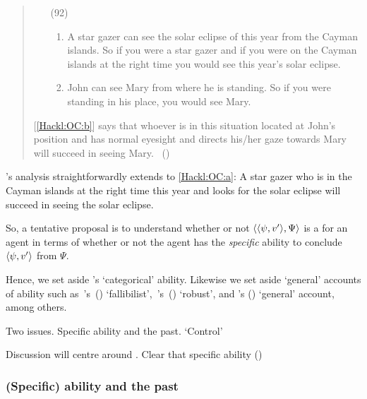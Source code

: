 \begin{note}
  \begin{quote}
    \begin{enumerate}
    \item[(92)]
      \begin{enumerate}[label=\alph*., ref=(\alph*)]
      \item
        \label{Hackl:OC:a}
        A star gazer can see the solar eclipse of this year from the Cayman islands.\newline
        So if you were a star gazer and if you were on the Cayman islands at the right time you would see this year's solar eclipse.
      \item
        \label{Hackl:OC:b}
        John can see Mary from where he is standing.\newline
        So if you were standing in his place, you would see Mary.
      \end{enumerate}
    \end{enumerate}

    [\ref{Hackl:OC:b}] says that whoever is in this situation located at John's position and has normal eyesight and directs his/her gaze towards Mary will succeed in seeing Mary.%
    \mbox{ }\hfill\mbox{(\citeyear[39]{Hackl:1998tt})}
  \end{quote}
  \citeauthor{Hackl:1998tt}'s analysis straightforwardly extends to \ref{Hackl:OC:a}:
  A star gazer who is in the Cayman islands at the right time this year and looks for the solar eclipse will succeed in seeing the solar eclipse.

  So, a tentative proposal is to understand whether or not \(\langle \langle \psi, v' \rangle, \Psi \rangle\) is a \fc{} for an agent in terms of whether or not the agent has the \emph{specific} ability to conclude \(\langle \psi, v' \rangle\) from \(\Psi\).

  Hence, we set aside \citeauthor{Austin:1961vz}'s `categorical' ability.
  Likewise we set aside `general' accounts of ability such as~\citeauthor{Carter:2021wd}'s~(\citeyear{Carter:2021wd}) `fallibilist',~\citeauthor{Kikkert:2022wp}'s~(\citeyear{Kikkert:2022wp}) `robust', and \citeauthor{Maier:2013vk}'s (\citeyear{Maier:2013vk}) `general' account, among others.

  Two issues.
  Specific ability and the past.
  `Control'

  Discussion will centre around \textcite{Boylan:2020aa}.
  Clear that specific ability (\citeyear[23, fn.3]{Boylan:2020aa})
\end{note}

\subsubsection{(Specific) ability and the past}
\label{cha:sec:fcs-def:ability:past}

